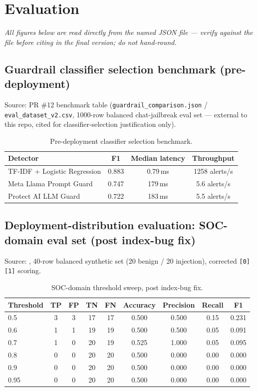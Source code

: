 \documentclass[twocolumn]{svjour3}
\begin{document}
\section{Evaluation}\label{sec4}

\noindent\textit{All figures below are read directly from the named JSON file --- verify against the file before citing in the final version; do not hand-round.}

\subsection{Guardrail classifier selection benchmark (pre-deployment)}\label{subsec4-1}
Source: PR \#12 benchmark table (\texttt{guardrail\_comparison.json} / \texttt{eval\_dataset\_v2.csv}, 1000-row balanced chat-jailbreak eval set --- external to this repo, cited for classifier-selection justification only).

\begin{table}[h]
\caption{Pre-deployment classifier selection benchmark.}\label{tab1}
\begin{tabular}{@{}lccc@{}}
\toprule
Detector & F1 & Median latency & Throughput \\
\midrule
TF-IDF + Logistic Regression & 0.883 & 0.79\,ms & 1258 alerts/s \\
Meta Llama Prompt Guard      & 0.747 & 179\,ms & 5.6 alerts/s \\
Protect AI LLM Guard         & 0.722 & 183\,ms & 5.5 alerts/s \\
\bottomrule
\end{tabular}
\end{table}

\subsection{Deployment-distribution evaluation: SOC-domain eval set (post index-bug fix)}\label{subsec4-2}
Source: , 40-row balanced synthetic set (20 benign / 20 injection), corrected \texttt{[0][1]} scoring.

\begin{table}[h]
\caption{SOC-domain threshold sweep, post index-bug fix.}\label{tab2}
\begin{tabular}{@{}lcccccccc@{}}
\toprule
Threshold & TP & FP & TN & FN & Accuracy & Precision & Recall & F1 \\
\midrule
0.5  & 3 & 3 & 17 & 17 & 0.500 & 0.500 & 0.15 & 0.231 \\
0.6  & 1 & 1 & 19 & 19 & 0.500 & 0.500 & 0.05 & 0.091 \\
0.7  & 1 & 0 & 20 & 19 & 0.525 & 1.000 & 0.05 & 0.095 \\
0.8  & 0 & 0 & 20 & 20 & 0.500 & 0.000 & 0.00 & 0.000 \\
0.9  & 0 & 0 & 20 & 20 & 0.500 & 0.000 & 0.00 & 0.000 \\
0.95 & 0 & 0 & 20 & 20 & 0.500 & 0.000 & 0.00 & 0.000 \\
\bottomrule
\end{tabular}
\end{table}
\end{document}

